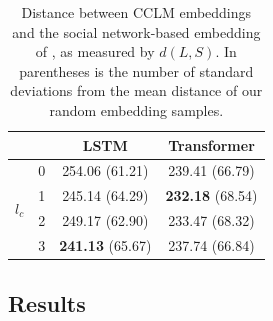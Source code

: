 \documentclass[11pt]{article}
\newcommand\jp[1]{\todo[backgroundcolor=blue!10]{JP: #1}}
\begin{document}
\begin{table}
\centering
\begin{tabular}{llcc}
\toprule
                        &   & LSTM     & Transformer \\
\midrule
  \multirow{4}{*}{$l_c$}  & 0 &         254.06  (61.21) &         239.41  (66.79)  \\
                          & 1 &         245.14  (64.29) & \textbf{232.18} (68.54)   \\
                          & 2 &         249.17  (62.90) &         233.47  (68.32)  \\
                          & 3 & \textbf{241.13} (65.67) &         237.74   (66.84) \\
\bottomrule
\end{tabular}
\caption{Distance between CCLM embeddings and the social network-based embedding
of \citet{Kumar2018}, as measured by $d(L,S)$. In parentheses is the number of standard deviations
from the mean distance of our random embedding samples.} \label{tab:embedding-correlations}
\end{table}



\subsection{Results}



\end{document}
